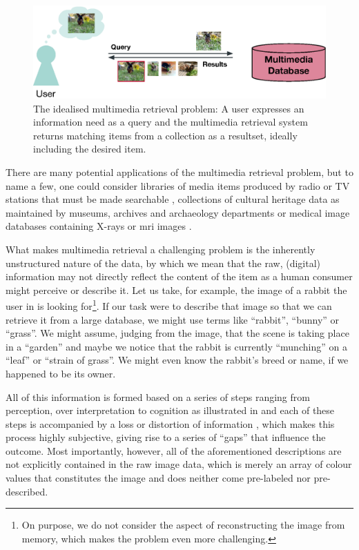 \begin{figure}[tb]
    \centering
    \includegraphics[width=\textwidth]{figures/mr-ideal.eps}
    \caption{The idealised multimedia retrieval problem: A user expresses an information need as a query and the multimedia retrieval system returns matching items from a collection as a resultset, ideally including the desired item.}
    \label{figure:mr-ideal}
\end{figure}

There are many potential applications of the multimedia retrieval problem, but to name a few, one could consider libraries of media items produced by radio or TV stations that must be made searchable \cite{Watanabe:1998Multimedia}, collections of cultural heritage data as maintained by museums, archives and archaeology departments \cite{Tsai:2007Review} or medical image databases containing X-rays or \acrshort{mri} images \cite{Mueller:2004Review}.

What makes multimedia retrieval a challenging problem is the inherently unstructured nature of the data, by which we mean that the raw, (digital) information may not directly reflect the content of the item as a human consumer might perceive or describe it. Let us take, for example, the image of a rabbit the user in  is looking for\footnote{On purpose, we do not consider the aspect of reconstructing the image from memory, which makes the problem even more challenging.}. If our task were to describe that image so that we can retrieve it from a large database, we might use terms like ``rabbit'', ``bunny'' or ``grass''. We might assume, judging from the image, that the scene is taking place in a ``garden'' and maybe we notice that the rabbit is currently ``munching'' on a ``leaf'' or ``strain of grass''. We might even know the rabbit's breed or name, if we happened to be its owner.

All of this information is formed based on a series of steps ranging from perception, over interpretation to cognition as illustrated in  and each of these steps is accompanied by a loss or distortion of information \cite{Javanmardi:2021Exploring,Rossetto:2018thesis}, which makes this process highly subjective, giving rise to a series of ``gaps'' that influence the outcome. Most importantly, however, all of the aforementioned descriptions are not explicitly contained in the raw image data, which is merely an array of colour values that constitutes the image and does neither come pre-labeled nor pre-described.

